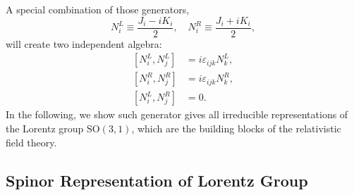 \documentclass[aps,prb,superscriptaddress,nofootinbib]{revtex4}
\begin{document}
A special combination of those generators,
\begin{equation}
	N_i^{L} \equiv \frac{J_i - i K_i}{2}, \quad
	N_i^{R} \equiv \frac{J_i + i K_i}{2},
\end{equation}
will create two independent algebra:
\begin{equation}\label{eq:RFT-LG-Alg}
\begin{aligned}
	\left[N_i^L, N_j^L \right] &= i\varepsilon_{ijk}N_k^L, \\
	\left[N_i^R, N_j^R \right] &= i\varepsilon_{ijk}N_k^R, \\
	\left[N_i^L, N_j^R \right] &= 0.
\end{aligned}
\end{equation}
In the following, we show such generator gives all irreducible representations of the Lorentz group $\mathrm{SO}(3,1)$, which are the building blocks of the relativistic field theory.


\subsection{Spinor Representation of Lorentz Group}
\end{document}
